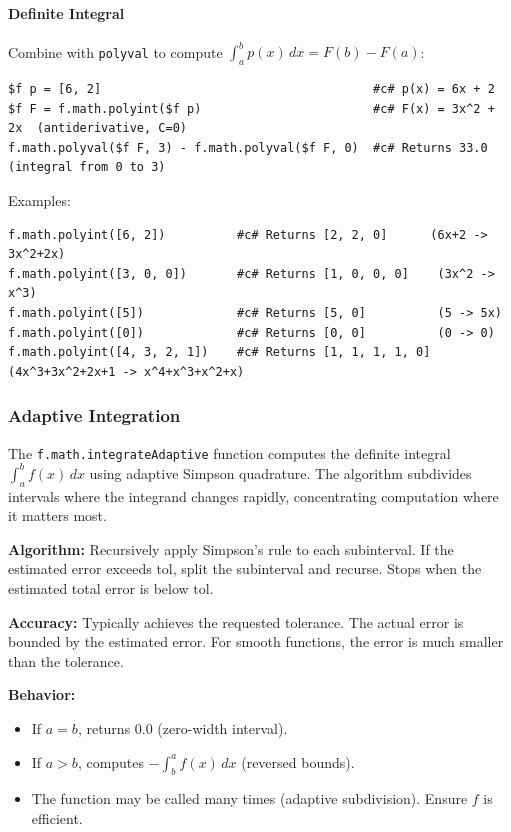 \paragraph{Definite Integral} Combine with \texttt{polyval} to compute $\int_a^b p(x)\,dx = F(b) - F(a)$:
\begin{verbatim}
$f p = [6, 2]                                      #c# p(x) = 6x + 2
$f F = f.math.polyint($f p)                        #c# F(x) = 3x^2 + 2x  (antiderivative, C=0)
f.math.polyval($f F, 3) - f.math.polyval($f F, 0)  #c# Returns 33.0  (integral from 0 to 3)
\end{verbatim}
Examples:
\begin{verbatim}
f.math.polyint([6, 2])          #c# Returns [2, 2, 0]      (6x+2 -> 3x^2+2x)
f.math.polyint([3, 0, 0])       #c# Returns [1, 0, 0, 0]    (3x^2 -> x^3)
f.math.polyint([5])             #c# Returns [5, 0]          (5 -> 5x)
f.math.polyint([0])             #c# Returns [0, 0]          (0 -> 0)
f.math.polyint([4, 3, 2, 1])    #c# Returns [1, 1, 1, 1, 0]  (4x^3+3x^2+2x+1 -> x^4+x^3+x^2+x)
\end{verbatim}

\subsubsection{Adaptive Integration}
The \texttt{f.math.integrateAdaptive} function computes the definite integral $\int_a^b f(x)\,dx$ using adaptive Simpson quadrature. The algorithm subdivides intervals where the integrand changes rapidly, concentrating computation where it matters most.

\textbf{Algorithm:} Recursively apply Simpson's rule to each subinterval. If the estimated error exceeds $\text{tol}$, split the subinterval and recurse. Stops when the estimated total error is below $\text{tol}$.

\textbf{Accuracy:} Typically achieves the requested tolerance. The actual error is bounded by the estimated error. For smooth functions, the error is much smaller than the tolerance.

\textbf{Behavior:}
\begin{itemize}
\item If $a = b$, returns 0.0 (zero-width interval).
\item If $a > b$, computes $-\int_b^a f(x)\,dx$ (reversed bounds).
\item The function may be called many times (adaptive subdivision). Ensure $f$ is efficient.
\end{itemize}

